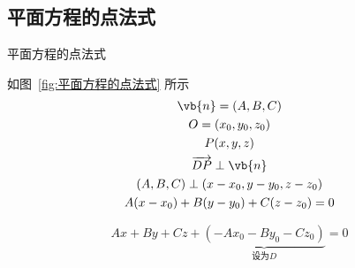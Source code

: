 \subsection{平面方程的点法式}%
\begin{figure}
	
\end{figure}
\begin{marginfigure}
	\begin{flushright}
		
		\caption{平面方程的点法式}
		\label{fig:平面方程的点法式}
	\end{flushright}
\end{marginfigure}
如图~\ref{fig:平面方程的点法式} 所示
\begin{gather*}
	\vb{n} = (A,B,C) \\
	O = (x_0, y_0, z_0)  \\
	P(x,y,z) \\
	\overrightarrow{DP} \perp \vb{n} \\
	(A,B,C) \perp (x-x_0, y-y_0, z-z_0) \\
	A(x-x_0) + B(y-y_0) + C(z-z_0) = 0
\end{gather*}

\begin{equation}
	\label{eq:平面方程的点法式}
	Ax + By + Cz + \underbrace{(- Ax_0 -B y_0 - C z_0 )}_{\text{设为}D} = 0
\end{equation}
